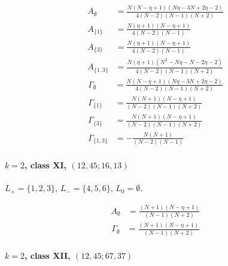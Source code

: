 \documentclass[11pt]{article}
\begin{document}
\begin{align*}
  A_{\emptyset} &= \frac{N \left(N - \eta + 1\right) \left(N \eta - 3 N + 2 \eta - 2\right)}{4 \left(N - 2\right) \left(N - 1\right) \left(N + 2\right)} \\
  A_{\{1\}} &= \frac{N \left(\eta + 1\right) \left(N - \eta + 1\right)}{4 \left(N - 2\right) \left(N - 1\right)} \\
  A_{\{3\}} &= \frac{N \left(\eta + 1\right) \left(N - \eta + 1\right)}{4 \left(N - 2\right) \left(N - 1\right)} \\
  A_{\{1,3\}} &= \frac{N \left(\eta + 1\right) \left(N^{2} - N \eta - N - 2 \eta - 2\right)}{4 \left(N - 2\right) \left(N - 1\right) \left(N + 2\right)} 
\end{align*}
\begin{align*}
  \Gamma_{\emptyset} &= \frac{N \left(N - \eta + 1\right) \left(N \eta - 3 N + 2 \eta - 2\right)}{4 \left(N - 2\right) \left(N - 1\right) \left(N + 2\right)} \\
  \Gamma_{\{1\}} &= \frac{N \left(N + 1\right) \left(N - \eta + 1\right)}{\left(N - 2\right) \left(N - 1\right) \left(N + 2\right)} \\
  \Gamma_{\{3\}} &= \frac{N \left(N + 1\right) \left(N - \eta + 1\right)}{\left(N - 2\right) \left(N - 1\right) \left(N + 2\right)} \\
  \Gamma_{\{1,3\}} &= - \frac{N \left(N + 1\right)}{\left(N - 2\right) \left(N - 1\right)} 
\end{align*}

\paragraph{$k=2$, class XI, $(12,45;16,13)$}

$L_+=\{1,2,3\}$, $L_-=\{4,5,6\}$, $L_0=\emptyset$.

\begin{align*}
  A_{\emptyset} &= \frac{\left(N + 1\right) \left(N - \eta + 1\right)}{\left(N - 1\right) \left(N + 2\right)} 
\end{align*}
\begin{align*}
  \Gamma_{\emptyset} &= \frac{\left(N + 1\right) \left(N - \eta + 1\right)}{\left(N - 1\right) \left(N + 2\right)} 
\end{align*}

\paragraph{$k=2$, class XII, $(12,45;67,37)$}
\end{document}
